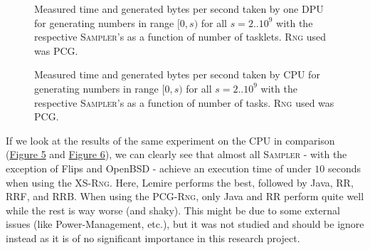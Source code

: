 \documentclass[a4paper]{scrartcl}
\begin{document}
\begin{figure}[!htb] \label{fig:5}
    \caption{
        Measured time and generated bytes per second taken by one DPU for generating numbers in range $[0,s)$ for all $s = 2..10^9$ with the respective \textsc{Sampler}'s as a function of number of tasklets. \textsc{Rng} used was PCG.      
    }   
\end{figure}


\begin{figure}[!htb] \label{fig:6}
    \caption{
        Measured time and generated bytes per second taken by CPU for generating numbers in range $[0,s)$ for all $s = 2..10^9$ with the respective \textsc{Sampler}'s as a function of number of tasks. \textsc{Rng} used was PCG.    
    }   
\end{figure}

\clearpage
If we look at the results of the same experiment on the CPU in comparison (\hyperref[fig:5]{Figure 5} and \hyperref[fig:6]{Figure 6}), we can clearly see that almost all \textsc{Sampler} - with the exception of Flips and OpenBSD - achieve an execution time of under $10$ seconds when using the XS-\textsc{Rng}.
Here, Lemire performs the best, followed by Java, RR, RRF, and RRB.
When using the PCG-\textsc{Rng}, only Java and RR perform quite well while the rest is way worse (and shaky). 
This might be due to some external issues (like Power-Management, etc.), but it was not studied and should be ignore instead as it is of no significant importance in this research project.

\printbibliography
\end{document}
